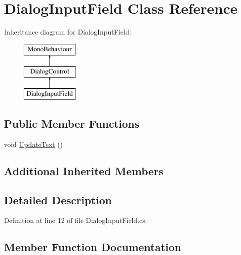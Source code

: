 \hypertarget{class_dialog_input_field}{}\section{Dialog\+Input\+Field Class Reference}
\label{class_dialog_input_field}
Inheritance diagram for Dialog\+Input\+Field\+:\begin{figure}[H]
\begin{center}
\leavevmode
\includegraphics[height=3.000000cm]{class_dialog_input_field}
\end{center}
\end{figure}
\subsection*{Public Member Functions}
\begin{DoxyCompactItemize}
\item 
void \hyperlink{class_dialog_input_field_a637cfbe4d6bbfba4d8ecfaf1542243f6}{Update\+Text} ()
\end{DoxyCompactItemize}
\subsection*{Additional Inherited Members}


\subsection{Detailed Description}


Definition at line 12 of file Dialog\+Input\+Field.\+cs.



\subsection{Member Function Documentation}
\mbox{\label{class_dialog_input_field_a637cfbe4d6bbfba4d8ecfaf1542243f6}} 
